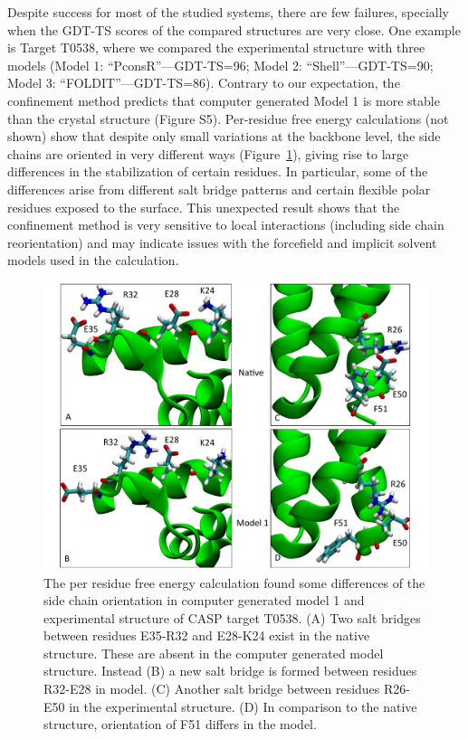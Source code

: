 \documentclass[12pt]{article}
\begin{document}
Despite success for most of the studied systems, there are few failures, specially when the GDT-TS scores of the
compared structures are very close. One example is Target T0538, where we compared the experimental structure with three
models (Model 1: ``PconsR''---GDT-TS=96; Model 2: ``Shell''---GDT-TS=90; Model 3: ``FOLDIT''---GDT-TS=86). Contrary to
our expectation, the confinement method predicts that computer generated Model 1 is more stable than the crystal structure (Figure S5).
Per-residue free energy calculations (not shown) show that despite only small variations at the backbone level, the
side chains are oriented in very different ways (Figure~\ref{fig:T0538compare}), giving rise to large differences in the stabilization of
certain residues. In particular, some of the differences arise from different salt bridge patterns and certain flexible
polar residues exposed to the surface. This unexpected result shows that the confinement method is very sensitive to
local interactions (including side chain reorientation) and may indicate issues with the forcefield and implicit solvent
models used in the calculation.


\begin{figure}
\begin{center}
\includegraphics[width=4.9 in,height=4.0 in]{Target_538_compare.pdf}
\end{center}
\caption{The per residue free energy calculation found some differences of the side chain orientation in computer generated model 1 and 
experimental structure of CASP target T0538. 
(A) Two salt bridges between residues E35-R32 and E28-K24 exist in the native structure. These are
absent in the computer generated model structure. Instead
(B) a new salt bridge is formed between residues R32-E28 in model. (C) Another salt bridge between
residues  R26-E50 in the experimental structure. (D) In comparison to the native 
structure, orientation of F51 differs in the model.}
\label{fig:T0538compare}
\end{figure}
\end{document}
